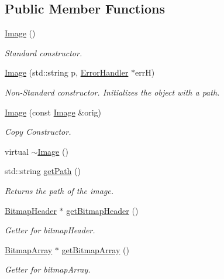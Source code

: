 \subsection*{Public Member Functions}
\begin{DoxyCompactItemize}
\item 
\mbox{\hyperlink{classImage_a58edd1c45b4faeb5f789b0d036d02313}{Image}} ()
\begin{DoxyCompactList}\small\item\em Standard constructor. \end{DoxyCompactList}\item 
\mbox{\hyperlink{classImage_ae17a70dac9941346eab9e5abef1c03c7}{Image}} (std\+::string p, \mbox{\hyperlink{classErrorHandler}{Error\+Handler}} $\ast$errH)
\begin{DoxyCompactList}\small\item\em Non-\/\+Standard constructor. Initializes the object with a path. \end{DoxyCompactList}\item 
\mbox{\hyperlink{classImage_abda271aa11b907dda8c8c8176684227d}{Image}} (const \mbox{\hyperlink{classImage}{Image}} \&orig)
\begin{DoxyCompactList}\small\item\em Copy Constructor. \end{DoxyCompactList}\item 
virtual \mbox{\hyperlink{classImage_a0294f63700543e11c0f0da85601c7ae5}{$\sim$\+Image}} ()
\item 
std\+::string \mbox{\hyperlink{classImage_a885989eb723cb0a1fc0555c7e8de817e}{get\+Path}} ()
\begin{DoxyCompactList}\small\item\em Returns the path of the image. \end{DoxyCompactList}\item 
\mbox{\hyperlink{classBitmapHeader}{Bitmap\+Header}} $\ast$ \mbox{\hyperlink{classImage_a8c824ffac0c866a94752a2c1047932af}{get\+Bitmap\+Header}} ()
\begin{DoxyCompactList}\small\item\em Getter for bitmap\+Header. \end{DoxyCompactList}\item 
\mbox{\hyperlink{classBitmapArray}{Bitmap\+Array}} $\ast$ \mbox{\hyperlink{classImage_a75b5051c6cc39a5e3f86d287f5cc7f9c}{get\+Bitmap\+Array}} ()
\begin{DoxyCompactList}\small\item\em Getter for bitmap\+Array. \end{DoxyCompactList}\item 

\end{DoxyCompactItemize}
